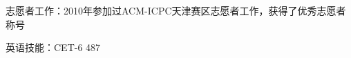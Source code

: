\begin{cvline}
  \cvsingleline 
  {
  	\begin{cvitems}
    	\item {志愿者工作：2010年参加过ACM-ICPC天津赛区志愿者工作，获得了优秀志愿者称号}
    	\item {英语技能：CET-6 487}
    \end{cvitems}
  }
\end{cvline}
